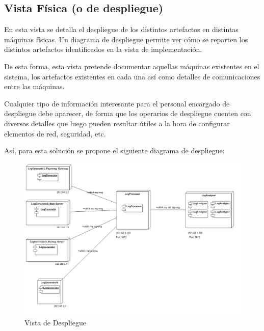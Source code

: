 \documentclass[11pt]{article}
\begin{document}
\subsection{Vista Física (o de despliegue)}
En esta vista se detalla el despliegue de los distintos artefactos en distintas máquinas físicas. Un diagrama de despliegue permite ver cómo se reparten los distintos artefactos identificados en la vista de implementación.

De esta forma, esta vista pretende documentar aquellas máquinas existentes en el sistema, los artefactos existentes en cada una así como detalles de comunicaciones entre las máquinas.

Cualquier tipo de información interesante para el personal encargado de despliegue debe aparecer, de forma que los operarios de despliegue cuenten con diversos detalles que luego pueden resultar útiles a la hora de configurar elementos de red, seguridad, etc.

Así, para esta solución se propone el siguiente diagrama de despliegue:

\begin{landscape}
\begin{center}
 \begin{figure}[H]
 \begin{center}
   \includegraphics[width=20.5cm]{img/physical_view00.png}
   \caption{Vista de Despliegue}
   \label{fig:4plus1views}
 \end{center}
 \end{figure}
\end{center}
\end{landscape}
\restoregeometry
\end{document}
